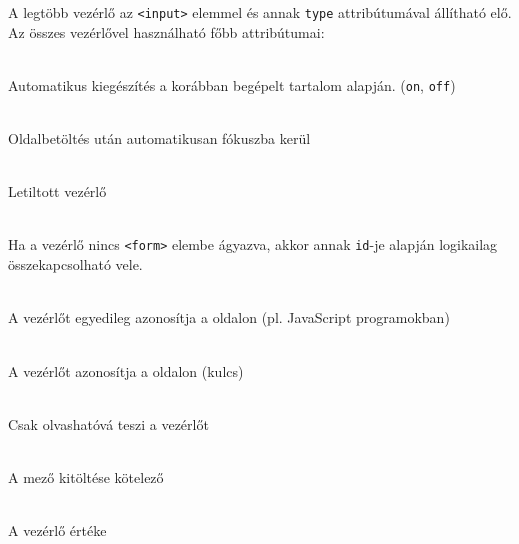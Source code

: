 \begin{frame}
  A legtöbb vezérlő az \texttt{<input>} elemmel és annak \texttt{type} 
  attribútumával állítható elő. Az összes vezérlővel használható főbb 
  attribútumai: 
  \begin{description}[m]
    \item[\texttt{autocomplete}] \hfill \\ Automatikus kiegészítés a 
    korábban begépelt tartalom alapján. (\texttt{on}, \texttt{off}) 
    \item[\texttt{autofocus}] \hfill \\ Oldalbetöltés után 
    automatikusan fókuszba kerül 
    \item[\texttt{disabled}] \hfill \\ Letiltott vezérlő 
    \item[\texttt{form}] \hfill \\ Ha a vezérlő 
    nincs \texttt{<form>} elembe ágyazva, akkor annak \texttt{id}-je 
    alapján logikailag összekapcsolható vele.
  \end{description}
\end{frame}

\begin{frame}
  \begin{description}[m]
    \item[\texttt{id}] \hfill \\ A vezérlőt egyedileg azonosítja a 
     oldalon (pl. JavaScript programokban)
    \item[\texttt{name}] \hfill \\ A vezérlőt azonosítja a 
     oldalon (kulcs) 
    \item[\texttt{readonly}] \hfill \\ Csak olvashatóvá teszi a vezérlőt 
    \item[\texttt{required}] \hfill \\ A mező kitöltése kötelező 
    \item[\texttt{value}] \hfill \\ A vezérlő értéke
  \end{description}
\end{frame}

